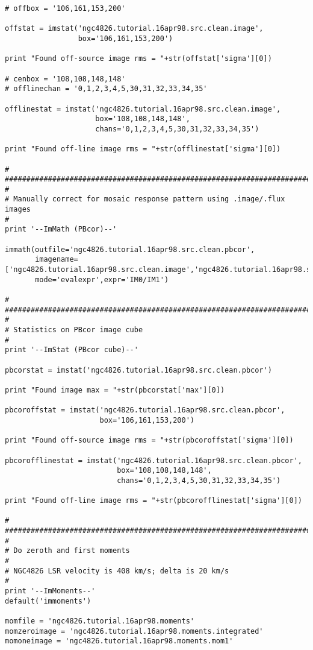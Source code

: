 \begin{verbatim}
# offbox = '106,161,153,200'

offstat = imstat('ngc4826.tutorial.16apr98.src.clean.image',
                 box='106,161,153,200')

print "Found off-source image rms = "+str(offstat['sigma'][0])

# cenbox = '108,108,148,148'
# offlinechan = '0,1,2,3,4,5,30,31,32,33,34,35'

offlinestat = imstat('ngc4826.tutorial.16apr98.src.clean.image',
                     box='108,108,148,148',
                     chans='0,1,2,3,4,5,30,31,32,33,34,35')

print "Found off-line image rms = "+str(offlinestat['sigma'][0])

#
##########################################################################
#
# Manually correct for mosaic response pattern using .image/.flux images
#
print '--ImMath (PBcor)--'

immath(outfile='ngc4826.tutorial.16apr98.src.clean.pbcor',
       imagename=['ngc4826.tutorial.16apr98.src.clean.image','ngc4826.tutorial.16apr98.src.clean.flux'],
       mode='evalexpr',expr='IM0/IM1')

#
##########################################################################
#
# Statistics on PBcor image cube
#
print '--ImStat (PBcor cube)--'

pbcorstat = imstat('ngc4826.tutorial.16apr98.src.clean.pbcor')

print "Found image max = "+str(pbcorstat['max'][0])

pbcoroffstat = imstat('ngc4826.tutorial.16apr98.src.clean.pbcor',
                      box='106,161,153,200')

print "Found off-source image rms = "+str(pbcoroffstat['sigma'][0])

pbcorofflinestat = imstat('ngc4826.tutorial.16apr98.src.clean.pbcor',
                          box='108,108,148,148',
                          chans='0,1,2,3,4,5,30,31,32,33,34,35')

print "Found off-line image rms = "+str(pbcorofflinestat['sigma'][0])

#
##########################################################################
#
# Do zeroth and first moments
#
# NGC4826 LSR velocity is 408 km/s; delta is 20 km/s
#
print '--ImMoments--'
default('immoments')

momfile = 'ngc4826.tutorial.16apr98.moments'
momzeroimage = 'ngc4826.tutorial.16apr98.moments.integrated'
momoneimage = 'ngc4826.tutorial.16apr98.moments.mom1'


\end{verbatim}
